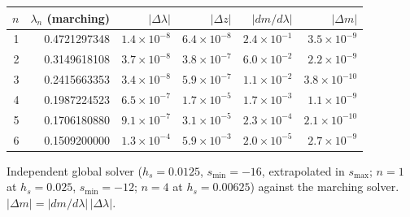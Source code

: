 \begin{tabular}{rrrrrr}
\toprule
$n$ & $\lambda_n$ (marching) & $|\Delta\lambda|$ & $|\Delta z|$ & $|dm/d\lambda|$ & $|\Delta m|$\\
\midrule
1 & 0.4721297348 & $1.4\times10^{-8}$ & $6.4\times10^{-8}$ & $2.4\times10^{-1}$ & $3.5\times10^{-9}$\\
2 & 0.3149618108 & $3.7\times10^{-8}$ & $3.8\times10^{-7}$ & $6.0\times10^{-2}$ & $2.2\times10^{-9}$\\
3 & 0.2415663353 & $3.4\times10^{-8}$ & $5.9\times10^{-7}$ & $1.1\times10^{-2}$ & $3.8\times10^{-10}$\\
4 & 0.1987224523 & $6.5\times10^{-7}$ & $1.7\times10^{-5}$ & $1.7\times10^{-3}$ & $1.1\times10^{-9}$\\
5 & 0.1706180880 & $9.1\times10^{-7}$ & $3.1\times10^{-5}$ & $2.3\times10^{-4}$ & $2.1\times10^{-10}$\\
6 & 0.1509200000 & $1.3\times10^{-4}$ & $5.9\times10^{-3}$ & $2.0\times10^{-5}$ & $2.7\times10^{-9}$\\
\bottomrule
\end{tabular}

\smallskip\par\footnotesize Independent global solver ($h_s=0.0125$, $s_{\min}=-16$, extrapolated in $s_{\max}$; $n=1$ at $h_s=0.025$, $s_{\min}=-12$; $n=4$ at $h_s=0.00625$) against the marching solver. $|\Delta m|=|dm/d\lambda|\,|\Delta\lambda|$.
